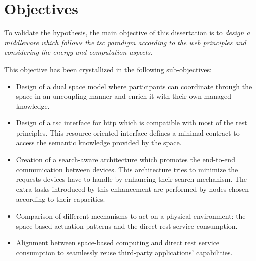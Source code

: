 \section{Objectives}

To validate the hypothesis, the main objective of this dissertation is to
\emph{design a middleware which follows the \ac{tsc} paradigm according to the web principles and considering the energy and computation aspects}.

This objective has been crystallized in the following sub-objectives:

\begin{itemize} %
  \item Design of a dual space model where participants can coordinate through the space in an uncoupling manner and enrich it with their own managed knowledge.
  \item Design of a \ac{tsc} interface for \ac{http} which is compatible with most of the \ac{rest} principles.
	This resource-oriented interface defines a minimal contract to access the semantic knowledge provided by the space. %
  \item Creation of a search-aware architecture which promotes the end-to-end communication between devices. %
	This architecture tries to minimize the requests devices have to handle by enhancing their search mechanism.
	The extra tasks introduced by this enhancement are performed by nodes chosen according to their capacities.
  \item Comparison of different mechanisms to act on a physical environment: the space-based actuation patterns and the direct \ac{rest} service consumption.
  \item Alignment between space-based computing and direct \ac{rest} service consumption to seamlessly reuse third-party applications' capabilities.
\end{itemize}